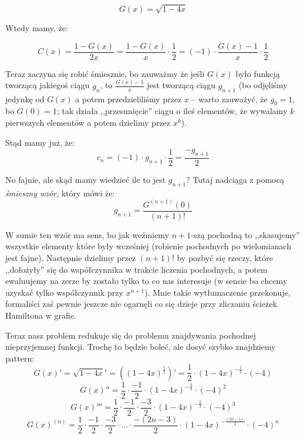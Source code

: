 \begin{equation*}
	G(x) = \sqrt{1 - 4x}
\end{equation*}

Wtedy mamy, że:

\begin{equation*}
	C(x) = \frac{1 - G(x)}{2x} = \frac{1 - G(x)}{x} \cdot \frac{1}{2} = (-1) \cdot \frac{G(x) - 1}{x} \cdot \frac{1}{2}
\end{equation*}

Teraz zaczyna się robić śmiesznie, bo zauważmy że jeśli \(G(x)\) było funkcją tworzącą jakiegoś ciągu \(g_n\), to \(\frac{G(x) - 1}{x}\) jest tworzącą ciągu \(g_{n+1}\) (bo odjęliśmy jedynkę od \(G(x)\) a potem przedzieliliśmy przez \(x\) -- warto zauważyć, że \(g_0 = 1\), bo \(G(0) = 1\); tak działa ,,przesunięcie'' ciągu o ileś elementów, że wywalamy \(k\) pierwszych elementów a potem dzielimy przez \(x^k\)).

Stąd mamy już, że:
\begin{equation*}
	c_n = (-1) \cdot g_{n+1} \cdot \frac{1}{2} = \frac{-g_{n+1}}{2}
\end{equation*}

No fajnie, ale skąd mamy wiedzieć ile to jest \(g_{n+1}\)? Tutaj nadciąga z pomocą \textit{śmieszny wzór}, który mówi że:
\begin{equation*}
	g_{n+1} = \frac{G^{(n+1)}(0)}{(n+1)!}
\end{equation*}

W sumie ten wzór ma sens, bo jak weźmiemy \(n+1\)-szą pochodną to ,,skasujemy'' wszystkie elementy które były wcześniej (robienie pochodnych po wielomianach jest fajne). Następnie dzielimy przez \((n+1)!\) by pozbyć się rzeczy, które ,,dołożyły'' się do współczynnika w trakcie liczenia pochodnych, a potem ewaluujemy na zerze by zostało tylko to co nas interesuje (w sensie bo chcemy uzyskać tylko współczynnik przy \(x^{n+1}\)). Mnie takie wytłumaczenie przekonuje, formaliści zaś pewnie jeszcze nie ogarnęli co się dzieje przy zliczaniu ścieżek Hamiltona w grafie.

Teraz nasz problem redukuje się do problemu znajdywania pochodnej nieprzyjemnej funkcji. Trochę to będzie boleć, ale dosyć szybko znajdziemy pattern:
\begin{equation*}
	G(x)' = \sqrt{1 - 4x}' = ((1-4x)^{\frac{1}{2}})' = \frac{1}{2} \cdot (1-4x)^{- \frac{1}{2}} \cdot (-4)
\end{equation*}
\begin{equation*}
	G(x)'' = \frac{1}{2} \cdot \frac{-1}{2} \cdot (1-4x)^{- \frac{3}{2}} \cdot (-4)^2
\end{equation*}
\begin{equation*}
	G(x)''' = \frac{1}{2} \cdot \frac{-1}{2} \cdot \frac{-3}{2} \cdot (1-4x)^{- \frac{5}{2}} \cdot (-4)^3
\end{equation*}
\begin{equation*}
	G(x)^{(n)} = \frac{1}{2} \cdot \frac{-1}{2} \cdot \frac{-3}{2} \cdot \dots \cdot \frac{-(2n - 3)}{2} \cdot (1-4x)^{- \frac{(2n-1)}{2}} \cdot (-4)^n
\end{equation*}

